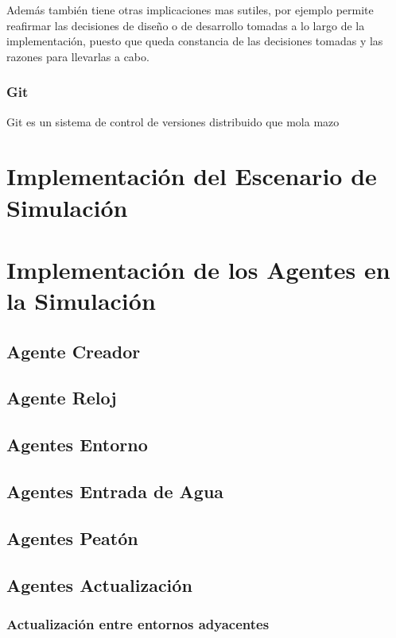 Además también tiene otras implicaciones mas sutiles, por ejemplo permite
reafirmar las decisiones de diseño o de desarrollo tomadas a lo largo de la
implementación, puesto que queda constancia de las decisiones tomadas y las
razones para llevarlas a cabo.
\subsubsection*{Git}

Git es un sistema de control de versiones distribuido que mola mazo %

\section*{Implementación del Escenario de Simulación}
\section*{Implementación de los Agentes en la Simulación}
\subsection*{Agente Creador}
\subsection*{Agente Reloj}
\subsection*{Agentes Entorno}
\subsection*{Agentes Entrada de Agua}
\subsection*{Agentes Peatón}
\subsection*{Agentes Actualización}
\subsubsection*{Actualización entre entornos adyacentes}
